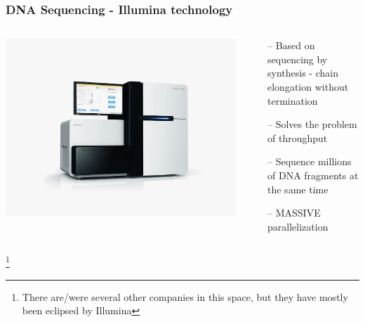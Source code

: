 \documentclass{beamer}
\newcommand\blfootnote[1]{%
	\begingroup
	\renewcommand\thefootnote{}\footnote{#1}%
	\addtocounter{footnote}{-1}%
	\endgroup
}
\begin{document}
\begin{frame}
	\frametitle{DNA Sequencing - Illumina technology}
\begin{columns}
	\begin{column}{0.5\textwidth}
			\includegraphics[width=\textwidth]{img/hiSeq}
	\end{column}
	\begin{column}{0.5\textwidth}
\begin{itemize}
\item[--] Based on sequencing by synthesis - chain elongation without termination
\item[--] Solves the problem of throughput
\item[--] Sequence millions of DNA fragments at the same time
\item[--] MASSIVE parallelization
\end{itemize}
	\end{column}
	\end{columns}
\blfootnote{There are/were several other companies in this space, but they have mostly been eclipsed by Illumina}

\end{frame}
\end{document}
